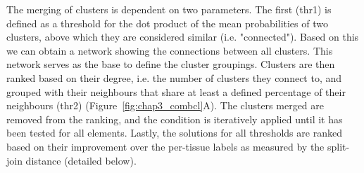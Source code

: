 The merging of clusters is dependent on two parameters. The first (thr1) is defined as a threshold for the dot product of the mean probabilities of two clusters, above which they are considered similar (i.e. "connected"). Based on this we can obtain a network showing the connections between all clusters. This network serves as the base to define the cluster groupings. Clusters are then ranked based on their degree, i.e. the number of clusters they connect to, and grouped with their neighbours that share at least a defined percentage of their neighbours (thr2) (Figure~\ref{fig:chap3_combcl}A). The clusters merged are removed from the ranking, and the condition is iteratively applied until it has been tested for all elements. Lastly, the solutions for all thresholds are ranked based on their improvement over the per-tissue labels as measured by the split-join distance (detailed below).

